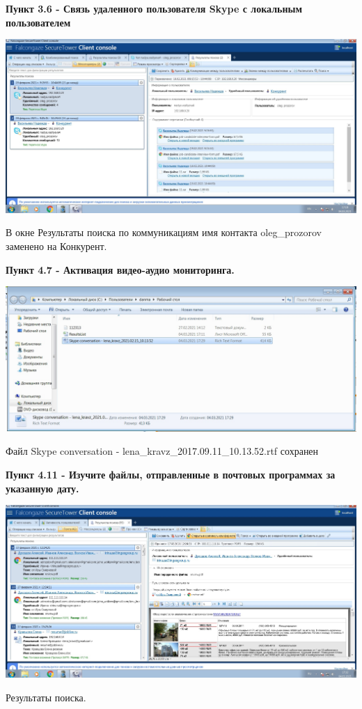 \documentclass[a4paper,14pt]{extarticle}
\begin{document}
    \newpage
    \textbf{Пункт 3.6 - Связь удаленного пользователя Skype с локальным пользователем}
    \begin{center}
        \includegraphics[scale=0.25]{pics/3.6.jpg}

        В окне Результаты поиска по коммуникациям имя контакта
        oleg\_prozorov заменено на Конкурент.
    \end{center}

    \textbf{Пункт 4.7 - Активация видео-аудио мониторинга.} 
    \begin{center}
        \includegraphics[scale=0.3]{pics/4.7.jpg}

        Файл Skype conversation - lena\_kravz\_2017.09.11\_10.13.52.rtf сохранен
    \end{center}

    \newpage
    \textbf{Пункт 4.11 - Изучите файлы, отправленные в почтовых программах за указанную дату.}
    \begin{center}
        \includegraphics[scale=0.25]{pics/4.11.jpg}

        Результаты поиска.
    \end{center}
\end{document}
